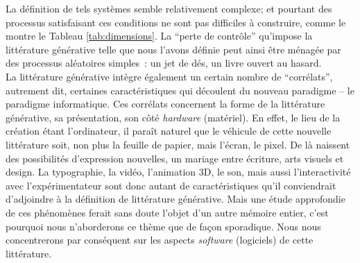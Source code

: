 \documentclass{article}
\begin{document}
			La définition de tels systèmes semble relativement complexe; et pourtant des processus satisfaisant ces conditions ne sont pas difficiles à construire, comme le montre le Tableau \ref{tab:dimensions}. La ``perte de contrôle'' qu'impose la littérature générative telle que nous l'avons définie peut ainsi être ménagée par des processus aléatoires simples~: un jet de dés, un livre ouvert au hasard.\\
			
			La littérature générative intègre également un certain nombre de ``corrélats'', autrement dit, certaines caractéristiques qui découlent du nouveau paradigme -- le paradigme informatique. Ces corrélats concernent la forme de la littérature générative, sa présentation, son côté \textit{hardware} (matériel). En effet, le lieu de la création étant l'ordinateur, il paraît naturel que le véhicule de cette nouvelle littérature soit, non plus la feuille de papier, mais l'écran, le pixel. De là naissent des possibilités d'expression nouvelles, un mariage entre écriture, arts visuels et design. La typographie, la vidéo, l'animation 3D, le son, mais aussi l'interactivité avec l'expérimentateur sont donc autant de caractéristiques qu'il conviendrait d'adjoindre à la définition de littérature générative. Mais une étude approfondie de ces phénomènes ferait sans doute l'objet d'un autre mémoire entier, c'est pourquoi nous n'aborderons ce thème que de façon sporadique. Nous nous concentrerons par conséquent sur les aspects \textit{software} (logiciels) de cette littérature.
		
\end{document}
